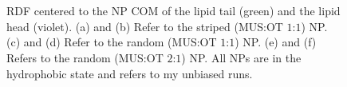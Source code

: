 \begin{figure}[p]
{		}\\%
		\,%
		\caption{\acs{RDF} centered to the \acs{NP} \acs{COM} of the lipid tail (green) and the lipid head (violet). (a) and (b) Refer to the striped (\acs{MUS}:\acs{OT} $1$:$1$) \acs{NP}. (c) and (d) Refer to the random (\acs{MUS}:\acs{OT} $1$:$1$) \acs{NP}. (e) and (f) Refers to the random (\acs{MUS}:\acs{OT} $2$:$1$) \acs{NP}. All \acp{NP} are in the hydrophobic state and refers to my unbiased runs.}%
		\label{fig:RDF}
\end{figure}

